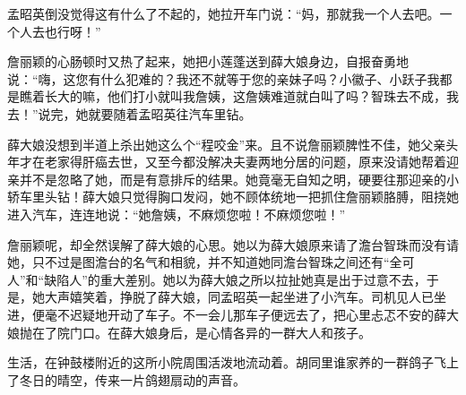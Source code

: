 \par 孟昭英倒没觉得这有什么了不起的，她拉开车门说：“妈，那就我一个人去吧。一个人去也行呀！”
\par 詹丽颖的心肠顿时又热了起来，她把小莲蓬送到薛大娘身边，自报奋勇地说：“嗨，这您有什么犯难的？我还不就等于您的亲妹子吗？小徽子、小跃子我都是瞧着长大的嘛，他们打小就叫我詹姨，这詹姨难道就白叫了吗？智珠去不成，我去！”说完，她就要随着孟昭英往汽车里钻。
\par 薛大娘没想到半道上杀出她这么个“程咬金”来。且不说詹丽颖脾性不佳，她父亲头年才在老家得肝癌去世，又至今都没解决夫妻两地分居的问题，原来没请她帮着迎亲并不是忽略了她，而是有意排斥的结果。她竟毫无自知之明，硬要往那迎亲的小轿车里头钻！薛大娘只觉得胸口发闷，她不顾体统地一把抓住詹丽颖胳膊，阻挠她进入汽车，连连地说：“她詹姨，不麻烦您啦！不麻烦您啦！”
\par 詹丽颖呢，却全然误解了薛大娘的心思。她以为薛大娘原来请了澹台智珠而没有请她，只不过是图澹台的名气和相貌，并不知道她同澹台智珠之间还有“全可人”和“缺陷人”的重大差别。她以为薛大娘之所以拉扯她真是出于过意不去，于是，她大声嬉笑着，挣脱了薛大娘，同孟昭英一起坐进了小汽车。司机见人已坐进，便毫不迟疑地开动了车子。不一会儿那车子便远去了，把心里忐忑不安的薛大娘抛在了院门口。在薛大娘身后，是心情各异的一群大人和孩子。
\par 生活，在钟鼓楼附近的这所小院周围活泼地流动着。胡同里谁家养的一群鸽子飞上了冬日的晴空，传来一片鸽翅扇动的声音。



